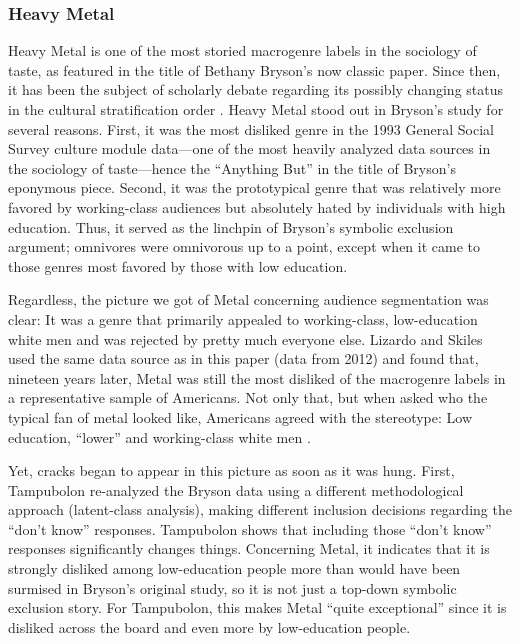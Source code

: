 \documentclass[a4paper,12pt]{extarticle}
\begin{document}
\subsubsection{Heavy Metal}
Heavy Metal is one of the most storied macrogenre labels in the sociology of taste, as featured in the title of Bethany Bryson's \citeyearpar{bryson96} now classic paper. Since then, it has been the subject of scholarly debate regarding its possibly changing status in the cultural stratification order \citep{tampubolon2008revisiting, goldberg2011mapping, lizardo_skiles15}. Heavy Metal stood out in Bryson's study for several reasons. First, it was the most disliked genre in the 1993 General Social Survey culture module data---one of the most heavily analyzed data sources in the sociology of taste---hence the ``Anything But'' in the title of Bryson's eponymous piece. Second, it was the prototypical genre that was relatively more favored by working-class audiences but absolutely hated by individuals with high education. Thus, it served as the linchpin of Bryson's symbolic exclusion argument; omnivores were omnivorous up to a point, except when it came to those genres most favored by those with low education. 

Regardless, the picture we got of Metal concerning audience segmentation was clear: It was a genre that primarily appealed to working-class, low-education white men and was rejected by pretty much everyone else. Lizardo and Skiles \citeyearpar[][6, table 2]{lizardo_skiles16} used the same data source as in this paper (data from 2012) and found that, nineteen years later, Metal was still the most disliked of the macrogenre labels in a representative sample of Americans. Not only that, but when asked who the typical fan of metal looked like, Americans agreed with the stereotype: Low education, ``lower'' and working-class white men \citep[][7, table 3]{lizardo_skiles16}. 

Yet, cracks began to appear in this picture as soon as it was hung. First, Tampubolon \citeyearpar{tampubolon2008revisiting} re-analyzed the Bryson data using a different methodological approach (latent-class analysis), making different inclusion decisions regarding the ``don't know'' responses. Tampubolon shows that including those ``don't know'' responses significantly changes things. Concerning Metal, it indicates that it is strongly disliked among low-education people more than would have been surmised in Bryson's original study, so it is not just a top-down symbolic exclusion story. For Tampubolon, this makes Metal ``quite exceptional'' since it is disliked across the board and even more by low-education people. 
\end{document}
